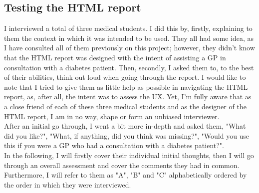 \subsection{Testing the HTML report}
I interviewed a total of three medical students. I did this by, firstly, explaining to them the context in which it was intended to be used. They all had some idea, as I have consulted all of them previously on this project; however, they didn't know that the HTML report was designed with the intent of assisting a GP in consultation with a diabetes patient. Then, secondly, I asked them to, to the best of their abilities, think out loud when going through the report. I would like to note that I tried to give them as little help as possible in navigating the HTML report, as, after all, the intent was to assess the UX. Yet, I'm fully aware that as a close friend of each of these three medical students and as the designer of the HTML report, I am in no way, shape or form an unbiased interviewer. 
\\
After an initial go through, I went a bit more in-depth and asked them, "What did you like?", "What, if anything, did you think was missing?", "Would you use this if you were a GP who had a consultation with a diabetes patient?".
\\
In the following, I will firstly cover their individual initial thoughts, then I will go through an overall assessment and cover the comments they had in common. Furthermore, I will refer to them as "A", "B" and "C" alphabetically ordered by the order in which they were interviewed.
\\
\\

